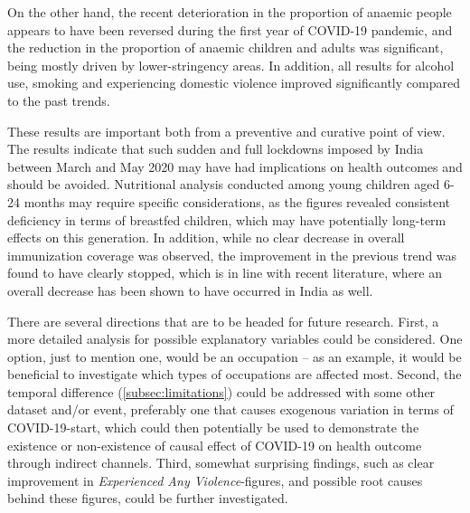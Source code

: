 \documentclass[12pt,a4paper,notitlepage]{article}
\begin{document}
On the other hand, the recent deterioration in the proportion of anaemic people appears to have been reversed during the first year of COVID-19 pandemic, and the reduction in the proportion of anaemic children and adults was significant, being mostly driven by lower-stringency areas. In addition, all results for alcohol use, smoking and experiencing domestic violence improved significantly compared to the past trends.

These results are important both from a preventive and curative point of view. The results indicate that such sudden and full lockdowns imposed by India between March and May 2020 may have had implications on health outcomes and should be avoided. Nutritional analysis conducted among young children aged 6-24 months may require specific considerations, as the figures revealed consistent deficiency in terms of breastfed children, which may have potentially long-term effects on this generation. In addition, while no clear decrease in overall immunization coverage was observed, the improvement in the previous trend was found to have clearly stopped, which is in line with recent literature, where an overall decrease has been shown to have occurred in India as well.

There are several directions that are to be headed for future research. First, a more detailed analysis for possible explanatory variables could be considered. One option, just to mention one, would be an occupation -- as an example, it would be beneficial to investigate which types of occupations are affected most. Second, the temporal difference (\cref{subsec:limitations}) could be addressed with some other dataset and/or event, preferably one that causes exogenous variation in terms of COVID-19-start, which could then potentially be used to demonstrate the existence or non-existence of causal effect of COVID-19 on health outcome through indirect channels. Third, somewhat surprising findings, such as clear improvement in \textit{Experienced Any Violence}-figures, and possible root causes behind these figures, could be further investigated.

\newpage

\end{document}
